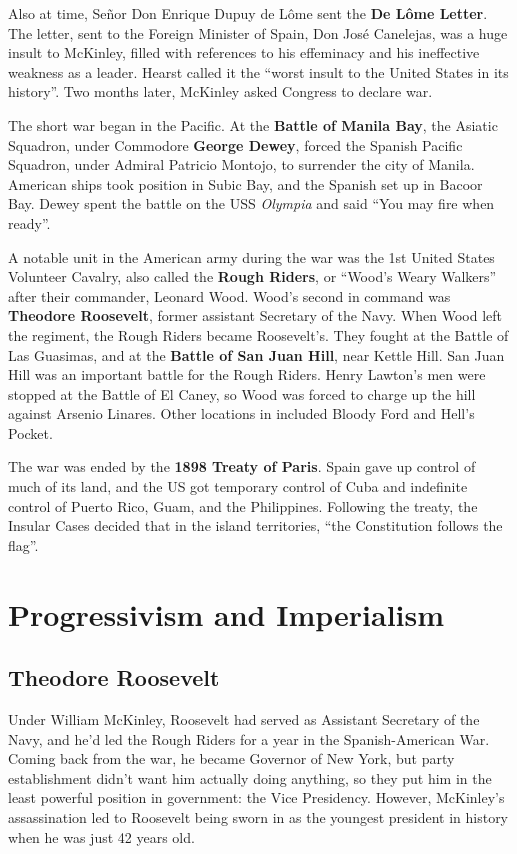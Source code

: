Also at time, Se\~nor Don Enrique Dupuy de L\^ome sent the \textbf{De L\^ome Letter}.
The letter, sent to the Foreign Minister of Spain, Don Jos\'e Canelejas, was a huge insult to McKinley,
filled with references to his effeminacy and his ineffective weakness as a leader.
Hearst called it the ``worst insult to the United States in its history''.
Two months later, McKinley asked Congress to declare war.

The short war began in the Pacific.
At the \textbf{Battle of Manila Bay},
the Asiatic Squadron, under Commodore \textbf{George Dewey},
forced the Spanish Pacific Squadron, under Admiral Patricio Montojo,
to surrender the city of Manila.
American ships took position in Subic Bay, and the Spanish set up in Bacoor Bay.
Dewey spent the battle on the USS \textit{Olympia} and said ``You may fire when ready''.

A notable unit in the American army during the war was the 1st United States Volunteer Cavalry,
also called the \textbf{Rough Riders}, or ``Wood's Weary Walkers'' after their commander, Leonard Wood.
Wood's second in command was \textbf{Theodore Roosevelt}, former assistant Secretary of the Navy.
When Wood left the regiment, the Rough Riders became Roosevelt's.
They fought at the Battle of Las Guasimas, and at the \textbf{Battle of San Juan Hill}, near Kettle Hill.
San Juan Hill was an important battle for the Rough Riders.
Henry Lawton's men were stopped at the Battle of El Caney,
so Wood was forced to charge up the hill against Arsenio Linares.
Other locations in included Bloody Ford and Hell's Pocket.

The war was ended by the \textbf{1898 Treaty of Paris}.
Spain gave up control of much of its land,
and the US got temporary control of Cuba and indefinite control of Puerto Rico, Guam, and the Philippines.
Following the treaty, the Insular Cases decided that in the island territories, ``the Constitution follows the flag''.

\section{Progressivism and Imperialism}

\subsection*{Theodore Roosevelt}

Under William McKinley, Roosevelt had served as Assistant Secretary of the Navy,
and he'd led the Rough Riders for a year in the Spanish-American War.
Coming back from the war, he became Governor of New York,
but party establishment didn't want him actually doing anything,
so they put him in the least powerful position in government: the Vice Presidency.
However, McKinley's assassination led to Roosevelt being sworn in as the youngest president in history
when he was just 42 years old.

